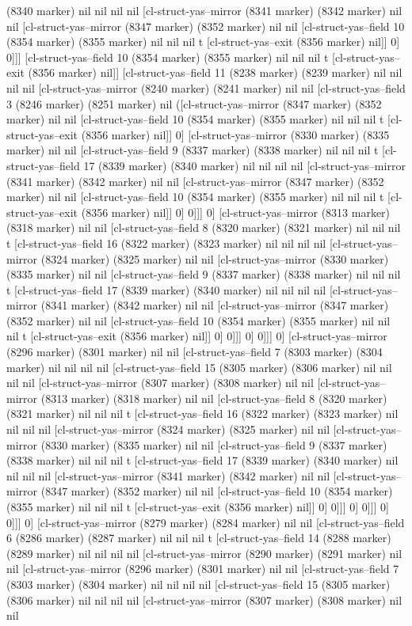 {{(8340 marker) nil nil nil nil [cl-struct-yas--mirror (8341 marker) (8342 marker) nil nil [cl-struct-yas--mirror (8347 marker) (8352 marker) nil nil [cl-struct-yas--field 10 (8354 marker) (8355 marker) nil nil nil t [cl-struct-yas--exit (8356 marker) nil]] 0] 0]]] [cl-struct-yas--field 10 (8354 marker) (8355 marker) nil nil nil t [cl-struct-yas--exit (8356 marker) nil]] [cl-struct-yas--field 11 (8238 marker) (8239 marker) nil nil nil nil [cl-struct-yas--mirror (8240 marker) (8241 marker) nil nil [cl-struct-yas--field 3 (8246 marker) (8251 marker) nil ([cl-struct-yas--mirror (8347 marker) (8352 marker) nil nil [cl-struct-yas--field 10 (8354 marker) (8355 marker) nil nil nil t [cl-struct-yas--exit (8356 marker) nil]] 0] [cl-struct-yas--mirror (8330 marker) (8335 marker) nil nil [cl-struct-yas--field 9 (8337 marker) (8338 marker) nil nil nil t [cl-struct-yas--field 17 (8339 marker) (8340 marker) nil nil nil nil [cl-struct-yas--mirror (8341 marker) (8342 marker) nil nil [cl-struct-yas--mirror (8347 marker) (8352 marker) nil nil [cl-struct-yas--field 10 (8354 marker) (8355 marker) nil nil nil t [cl-struct-yas--exit (8356 marker) nil]] 0] 0]]] 0] [cl-struct-yas--mirror (8313 marker) (8318 marker) nil nil [cl-struct-yas--field 8 (8320 marker) (8321 marker) nil nil nil t [cl-struct-yas--field 16 (8322 marker) (8323 marker) nil nil nil nil [cl-struct-yas--mirror (8324 marker) (8325 marker) nil nil [cl-struct-yas--mirror (8330 marker) (8335 marker) nil nil [cl-struct-yas--field 9 (8337 marker) (8338 marker) nil nil nil t [cl-struct-yas--field 17 (8339 marker) (8340 marker) nil nil nil nil [cl-struct-yas--mirror (8341 marker) (8342 marker) nil nil [cl-struct-yas--mirror (8347 marker) (8352 marker) nil nil [cl-struct-yas--field 10 (8354 marker) (8355 marker) nil nil nil t [cl-struct-yas--exit (8356 marker) nil]] 0] 0]]] 0] 0]]] 0] [cl-struct-yas--mirror (8296 marker) (8301 marker) nil nil [cl-struct-yas--field 7 (8303 marker) (8304 marker) nil nil nil nil [cl-struct-yas--field 15 (8305 marker) (8306 marker) nil nil nil nil [cl-struct-yas--mirror (8307 marker) (8308 marker) nil nil [cl-struct-yas--mirror (8313 marker) (8318 marker) nil nil [cl-struct-yas--field 8 (8320 marker) (8321 marker) nil nil nil t [cl-struct-yas--field 16 (8322 marker) (8323 marker) nil nil nil nil [cl-struct-yas--mirror (8324 marker) (8325 marker) nil nil [cl-struct-yas--mirror (8330 marker) (8335 marker) nil nil [cl-struct-yas--field 9 (8337 marker) (8338 marker) nil nil nil t [cl-struct-yas--field 17 (8339 marker) (8340 marker) nil nil nil nil [cl-struct-yas--mirror (8341 marker) (8342 marker) nil nil [cl-struct-yas--mirror (8347 marker) (8352 marker) nil nil [cl-struct-yas--field 10 (8354 marker) (8355 marker) nil nil nil t [cl-struct-yas--exit (8356 marker) nil]] 0] 0]]] 0] 0]]] 0] 0]]] 0] [cl-struct-yas--mirror (8279 marker) (8284 marker) nil nil [cl-struct-yas--field 6 (8286 marker) (8287 marker) nil nil nil t [cl-struct-yas--field 14 (8288 marker) (8289 marker) nil nil nil nil [cl-struct-yas--mirror (8290 marker) (8291 marker) nil nil [cl-struct-yas--mirror (8296 marker) (8301 marker) nil nil [cl-struct-yas--field 7 (8303 marker) (8304 marker) nil nil nil nil [cl-struct-yas--field 15 (8305 marker) (8306 marker) nil nil nil nil [cl-struct-yas--mirror (8307 marker) (8308 marker) nil nil }}
